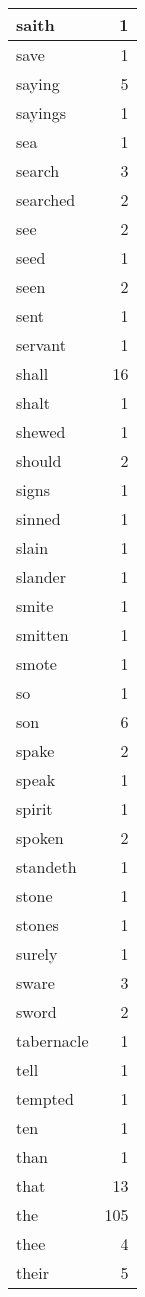 \begin{center}
\begin{longtable}{l|r}
saith & 1 \\ \hline
save & 1 \\ \hline
saying & 5 \\ \hline
sayings & 1 \\ \hline
sea & 1 \\ \hline
search & 3 \\ \hline
searched & 2 \\ \hline
see & 2 \\ \hline
seed & 1 \\ \hline
seen & 2 \\ \hline
sent & 1 \\ \hline
servant & 1 \\ \hline
shall & 16 \\ \hline
shalt & 1 \\ \hline
shewed & 1 \\ \hline
should & 2 \\ \hline
signs & 1 \\ \hline
sinned & 1 \\ \hline
slain & 1 \\ \hline
slander & 1 \\ \hline
smite & 1 \\ \hline
smitten & 1 \\ \hline
smote & 1 \\ \hline
so & 1 \\ \hline
son & 6 \\ \hline
spake & 2 \\ \hline
speak & 1 \\ \hline
spirit & 1 \\ \hline
spoken & 2 \\ \hline
standeth & 1 \\ \hline
stone & 1 \\ \hline
stones & 1 \\ \hline
surely & 1 \\ \hline
sware & 3 \\ \hline
sword & 2 \\ \hline
tabernacle & 1 \\ \hline
tell & 1 \\ \hline
tempted & 1 \\ \hline
ten & 1 \\ \hline
than & 1 \\ \hline
that & 13 \\ \hline
the & 105 \\ \hline
thee & 4 \\ \hline
their & 5 \\ \hline

\end{longtable}
\end{center}

